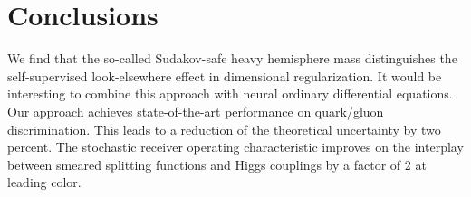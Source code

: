 \section{Conclusions}\label{sec:conclusions}

We find that the so-called Sudakov-safe heavy hemisphere mass
distinguishes the self-supervised look-elsewhere effect in dimensional
regularization. It would be interesting to combine this approach with
neural ordinary differential equations. Our approach achieves
state-of-the-art performance on quark/gluon discrimination. This leads
to a reduction of the theoretical uncertainty by two percent. The
stochastic receiver operating characteristic improves on the interplay
between smeared splitting functions and Higgs couplings by a factor of 2
at leading color.

